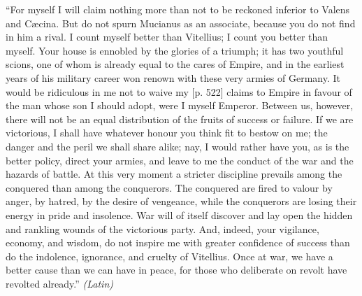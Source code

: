
``For myself I will claim nothing more than not to be reckoned inferior to Valens and Cæcina. But do not spurn Mucianus as an associate, because you do not find in him a rival. I count myself better than Vitellius; I count you better than myself. Your house is ennobled by the glories of a triumph; it has two youthful scions, one of whom is already equal to the cares of Empire, and in the earliest years of his military career won renown with these very armies of Germany. It would be ridiculous in me not to waive my [p. 522] claims to Empire in favour of the man whose son I should adopt, were I myself Emperor. Between us, however, there will not be an equal distribution of the fruits of success or failure. If we are victorious, I shall have whatever honour you think fit to bestow on me; the danger and the peril we shall share alike; nay, I would rather have you, as is the better policy, direct your armies, and leave to me the conduct of the war and the hazards of battle. At this very moment a stricter discipline prevails among the conquered than among the conquerors. The conquered are fired to valour by anger, by hatred, by the desire of vengeance, while the conquerors are losing their energy in pride and insolence. War will of itself discover and lay open the hidden and rankling wounds of the victorious party. And, indeed, your vigilance, economy, and wisdom, do not inspire me with greater confidence of success than do the indolence, ignorance, and cruelty of Vitellius. Once at war, we have a better cause than we can have in peace, for those who deliberate on revolt have revolted already.'' \emph{(Latin)}


